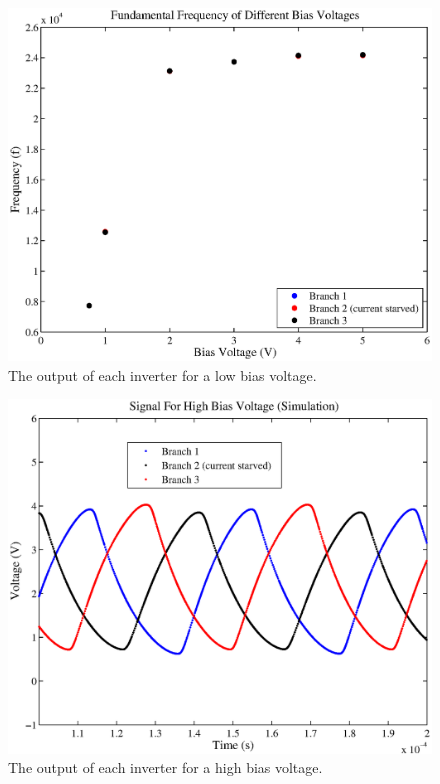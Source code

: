 \documentclass{article}
\begin{document}
\begin{figure}[H]
\centering
\includegraphics[scale=.7]{lowBiasSigSim.eps}
\caption{The output of each inverter for a low bias voltage.}
\label{lowBiasSigSim}
\end{figure}

\begin{figure}[H]
\centering
\includegraphics[scale=.7]{highBiasSigSim.eps}
\caption{The output of each inverter for a high bias voltage.}
\label{highBiasSigSim}
\end{figure}
\end{document}
